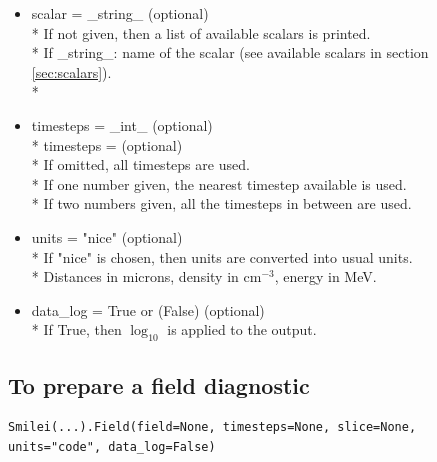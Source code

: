 \documentclass[11pt]{article}
\newcommand{\code}[1]{\colorbox{yellow!15}{\ttfamily #1}}
\begin{document}
\begin{itemize}
\item \code{scalar} = \code{\_string\_} (optional)\\*
	If not given, then a list of available scalars is printed.\\*
	If \code{\_string\_}: name of the scalar (see available scalars in section \ref{sec:scalars}).\\*

\item \code{timesteps} =  \code{\_int\_ }          (optional)\\*
	\code{timesteps} = \code{[\_int\_, \_int\_]}   (optional)\\*
	If omitted, all timesteps are used.\\*
	If one number  given, the nearest timestep available is used.\\*
	If two numbers given, all the timesteps in between are used.

\item \code{units} = \code{"nice"}    (optional)\\*
	If \code{"nice"} is chosen, then units are converted into usual units.\\*
	Distances in microns, density in cm$^{-3}$, energy in MeV.

\item \code{data\_log} = \code{True} or (\code{False})       (optional)\\*
	If True, then $\log_{10}$ is applied to the output.
\end{itemize}
\vspace{0.5cm}

\subsection{To prepare a field diagnostic}

\begin{lstlisting}
Smilei(...).Field(field=None, timesteps=None, slice=None, units="code", data_log=False)
\end{lstlisting}
\end{document}
